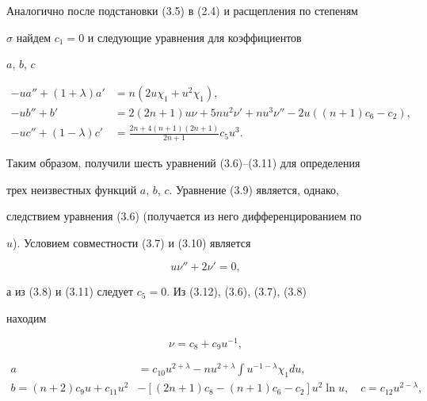 Аналогично после подстановки (3.5) в (2.4) и расщепления по степеням


$\sigma$ найдем $c_1=0$ и следующие уравнения для коэффициентов


$a$, $b$, $c$


\begin{align}


-ua''+(1+\lambda)a'&=n(2u\chi_1+u^2\chi_1),\tag{3.9}\\


-ub''+b'&=2(2n+1)u\nu+5nu^2\nu'+nu^3\nu''-


2u((n+1)c_6-c_2),\tag{3.10}\\


-uc''+(1-\lambda)c'&=\frac{2n+4(n+1)(2n+1)}{2n+1}c_5u^3.\tag{3.11}


\end{align}


Таким образом, получили шесть уравнений (3.6)--(3.11) для определения


трех неизвестных функций $a$, $b$, $c$. Уравнение (3.9) является, однако,


следствием уравнения (3.6) (получается из него дифференцированием по


$u$). Условием совместности (3.7) и (3.10) является


\begin{equation}


u\nu''+2\nu'=0,\tag{3.12}


\end{equation}


а из (3.8) и (3.11) следует $c_5=0$. Из (3.12), (3.6), (3.7), (3.8)


находим


\begin{equation}


\nu=c_8+c_9u^{-1},\tag{3.13}


\end{equation}


\begin{equation}


\begin{split}


a&=c_{10}u^{2+\lambda}-nu^{2+\lambda}\int u^{-1-\lambda}\chi_1


du,\\


b=(n+2)c_9u+c_{11}u^2 &-[(2n+1)c_8-(n+1)c_6-c_2]u^2\ln u,\quad


c=c_{12}u^{2-\lambda},


\end{split}


\tag{3.14}


\end{equation}


